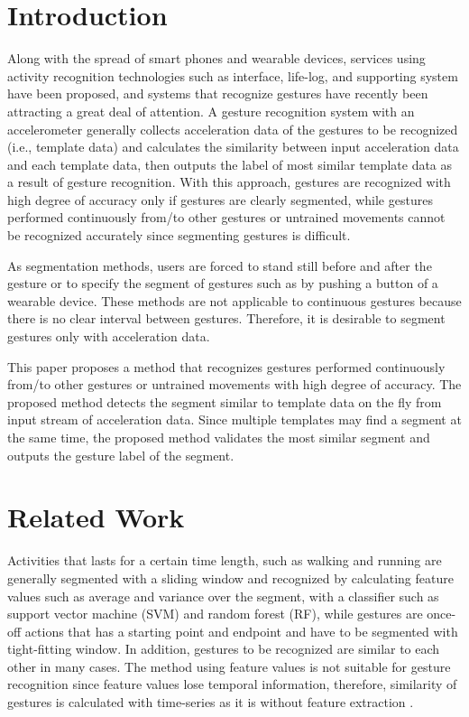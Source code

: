 \documentclass{sigchi-ext}
\begin{document}
        
        \section{Introduction}

        Along with the spread of smart phones and wearable devices, services using activity recognition technologies such as interface, life-log, and supporting system have been proposed, and systems that recognize gestures have recently been attracting a great deal of attention. A gesture recognition system with an accelerometer generally collects acceleration data of the gestures to be recognized (i.e., template data) and calculates the similarity between input acceleration data and each template data, then outputs the label of most similar template data as a result of gesture recognition. With this approach, gestures are recognized with high degree of accuracy only if gestures are clearly segmented, while gestures performed continuously from/to other gestures or untrained movements cannot  be recognized accurately since segmenting gestures is difficult. 
        
        As segmentation methods, users are forced to stand still before and after the gesture or to specify the segment of gestures such as by pushing a button of a wearable device. These methods are not applicable to continuous gestures because there is no clear interval between gestures. Therefore, it is desirable to segment gestures only with acceleration data. 
        
        This paper proposes a method that recognizes gestures performed continuously from/to other gestures or untrained movements with high degree of accuracy. The proposed method detects the segment similar to template data on the fly from input stream of acceleration data. Since multiple templates may find a segment at the same time, the proposed method validates the most similar segment and outputs the gesture label of the segment. 

        \section{Related Work}
        Activities that lasts for a certain time length, such as walking and running are generally segmented with a sliding window and recognized by calculating feature values such as average and variance over the segment, with a classifier such as support vector machine (SVM) and random forest (RF), while gestures are once-off actions that has a starting point and endpoint and have to be segmented with tight-fitting window.
        In addition, gestures to be recognized are similar to each other in many cases. The method using feature values is not suitable for gesture recognition since feature values lose temporal information, therefore, similarity of gestures is calculated with time-series as it is without feature extraction \cite{izuta,uwave}.
\end{document}
